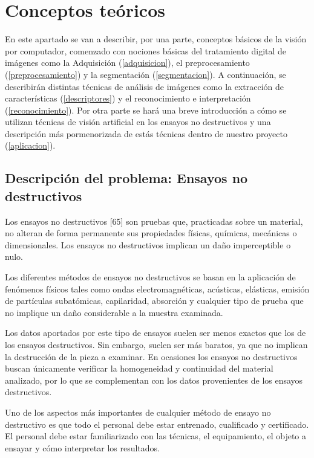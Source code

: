 \chapter{Conceptos teóricos}

En este apartado se van a describir, por una parte, conceptos básicos de la visión por computador, comenzado con nociones básicas del tratamiento digital de imágenes como la Adquisición (\ref{adquisicion}), el preprocesamiento (\ref{preprocesamiento}) y la segmentación (\ref{segmentacion}). A continuación, se describirán distintas técnicas de análisis de imágenes como la extracción de características (\ref{descriptores}) y el reconocimiento e interpretación (\ref{reconocimiento}). Por otra parte se hará una breve introducción a cómo se utilizan técnicas de visión artificial en los ensayos no destructivos y una descripción más pormenorizada de estás técnicas dentro de nuestro proyecto (\ref{aplicacion}).


\section{Descripción del problema: Ensayos no destructivos}
Los ensayos no destructivos [65] son pruebas que, practicadas sobre un material, no alteran de forma permanente sus propiedades físicas, químicas, mecánicas o dimensionales. Los ensayos no destructivos implican un daño imperceptible o nulo.

Los diferentes métodos de ensayos no destructivos se basan en la aplicación de fenómenos físicos tales como ondas electromagnéticas, acústicas, elásticas, emisión de partículas subatómicas, capilaridad, absorción y cualquier tipo de prueba que no implique un daño considerable a la muestra examinada.

Los datos aportados por este tipo de ensayos suelen ser menos exactos que los de los ensayos destructivos. Sin embargo, suelen ser más baratos, ya que no implican la destrucción de la pieza a examinar. En ocasiones los ensayos no destructivos buscan únicamente verificar la homogeneidad y continuidad del material analizado, por lo que se complementan con los datos provenientes de los ensayos destructivos.

Uno de los aspectos más importantes de cualquier método de ensayo no destructivo es que todo el personal debe estar entrenado, cualificado y certificado. El personal debe estar familiarizado con las técnicas, el equipamiento, el objeto a ensayar y cómo interpretar los resultados.

